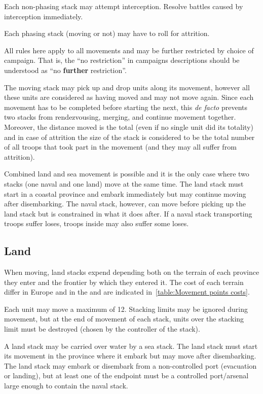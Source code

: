 Each non-phasing stack may attempt interception. Resolve battles caused by
interception immediately.

Each phasing stack (moving or not) may have to roll for attrition.

All rules here apply to all movements and may be further restricted by choice
of campaign. That is, the ``no restriction'' in campaigns descriptions should
be understood as ``no \textbf{further} restriction''.

The moving stack may pick up and drop units along its movement, however all
these units are considered as having moved and may not move again. Since each
movement has to be completed before starting the next, this \emph{de facto}
prevents two stacks from rendezvousing, merging, and continue movement
together. Moreover, the distance moved is the total (even if no single unit
did its totality) and in case of attrition the size of the stack is considered
to be the total number of all troops that took part in the movement (and they
may all suffer from attrition).

Combined land and sea movement is possible and it is the only case where two
stacks (one naval and one land) move at the same time. The land stack must
start in a coastal province and embark immediately but may continue moving
after disembarking. The naval stack, however, can move before picking up the
land stack but is constrained in what it does after. If a naval stack
transporting troops suffer loses, troops inside may also suffer some loses.

\subsection{Land}
When moving, land stacks expend \MP depending both on the terrain of each
province they enter and the frontier by which they entered it. The cost of
each terrain differ in Europe and in the \ROTW and are indicated
in~\ref{table:Movement points costs}.


Each unit may move a maximum of 12\MP. Stacking limits may be ignored during
movement, but at the end of movement of each stack, units over the stacking
limit must be destroyed (chosen by the controller of the stack).

A land stack may be carried over water by a sea stack. The land stack must
start its movement in the province where it embark but may move after
disembarking. The land stack may embark or disembark from a non-controlled
port (evacuation or landing), but at least one of the endpoint must be a
controlled port/arsenal large enough to contain the naval stack.

